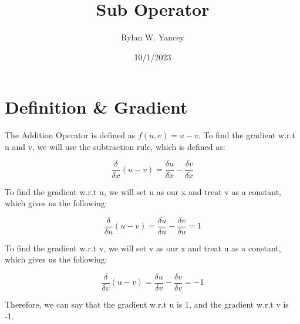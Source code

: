 \documentclass{article}
\title{Sub Operator}
\date{10/1/2023}
\author{Rylan W. Yancey}
\begin{document}
    \maketitle
    \section*{Definition \& Gradient}
    The Addition Operator is defined as $f(u,v) = u - v$. To find the gradient w.r.t u and v, 
    we will use the subtraction rule, which is defined as: 

    $$\frac{\delta}{\delta{x}}(u - v) = \frac{\delta{u}}{\delta{x}} - \frac{\delta{v}}{\delta{x}}$$

    To find the gradient w.r.t u, we will set u as our x and treat v as a constant, 
    which gives us the following:

    $$\frac{\delta}{\delta{u}}(u - v) = \frac{\delta{u}}{\delta{u}} - \frac{\delta{v}}{\delta{u}} = 1$$

    To find the gradient w.r.t v, we will set v as our x and treat u as a constant, 
    which gives us the following:

    $$\frac{\delta}{\delta{v}}(u - v) = \frac{\delta{u}}{\delta{v}} - \frac{\delta{v}}{\delta{v}} = -1$$

    Therefore, we can say that the gradient w.r.t u is 1, and the gradient w.r.t v is -1. 
\end{document}
